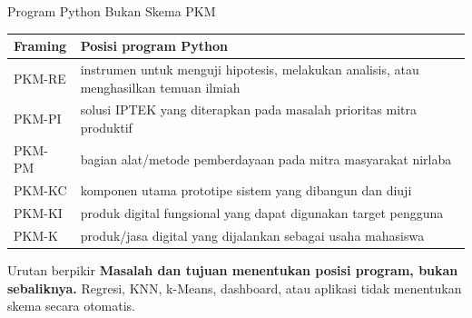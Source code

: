 \documentclass[aspectratio=169,11pt]{beamer}
\begin{document}
\begin{frame}{Program Python Bukan Skema PKM}
\footnotesize
\begin{center}
\renewcommand{\arraystretch}{1.03}
\begin{tabular}{p{2.3cm} p{10.4cm}}
\toprule
\textbf{Framing} & \textbf{Posisi program Python} \\
\midrule
PKM-RE & instrumen untuk menguji hipotesis, melakukan analisis, atau menghasilkan temuan ilmiah \\
PKM-PI & solusi IPTEK yang diterapkan pada masalah prioritas mitra produktif \\
PKM-PM & bagian alat/metode pemberdayaan pada mitra masyarakat nirlaba \\
PKM-KC & komponen utama prototipe sistem yang dibangun dan diuji \\
PKM-KI & produk digital fungsional yang dapat digunakan target pengguna \\
PKM-K & produk/jasa digital yang dijalankan sebagai usaha mahasiswa \\
\bottomrule
\end{tabular}
\end{center}
\vspace{1mm}
\begin{alertblock}{Urutan berpikir}
\scriptsize
\textbf{Masalah dan tujuan menentukan posisi program, bukan sebaliknya.} Regresi, KNN, k-Means, dashboard, atau aplikasi tidak menentukan skema secara otomatis.
\end{alertblock}
\end{frame}
\end{document}
